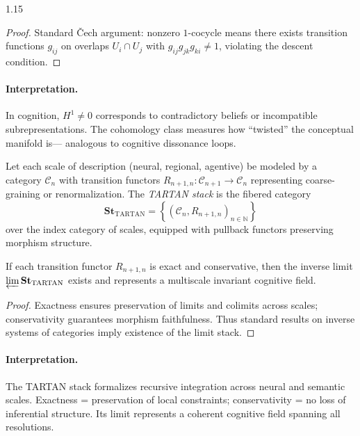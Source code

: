\documentclass[12pt,a4paper]{article}
\begin{document}
\begin{spacing}{1.15}
\begin{proof}
Standard Čech argument:
nonzero \(1\)-cocycle means there exists
transition functions \(g_{ij}\)
on overlaps \(U_i\cap U_j\)
with \(g_{ij}g_{jk}g_{ki}\neq 1\),
violating the descent condition.
\end{proof}

\paragraph{Interpretation.}
In cognition,
\(H^1\neq0\) corresponds to
contradictory beliefs or incompatible subrepresentations.
The cohomology class measures
how “twisted” the conceptual manifold is—
analogous to cognitive dissonance loops.

\begin{definition}
\label{def:stack}
Let each scale of description
(neural, regional, agentive)
be modeled by a category
\(\mathcal{C}_n\)
with transition functors
\(R_{n+1,n}:\mathcal{C}_{n+1}\to\mathcal{C}_n\)
representing coarse-graining or renormalization.
The \emph{TARTAN stack} is the fibered category
\[
  \mathbf{St}_{\mathrm{TARTAN}}
  = \left\{ (\mathcal{C}_n,R_{n+1,n})_{n\in\mathbb{N}} \right\}
\]
over the index category of scales,
equipped with pullback functors preserving morphism structure.
\end{definition}

\begin{proposition}
\label{prop:stack}
If each transition functor \(R_{n+1,n}\) is exact and conservative,
then the inverse limit
\(\varprojlim \mathbf{St}_{\mathrm{TARTAN}}\)
exists and represents
a multiscale invariant cognitive field.
\end{proposition}

\begin{proof}
Exactness ensures preservation of limits and colimits across scales;
conservativity guarantees morphism faithfulness.
Thus standard results on inverse systems of categories
imply existence of the limit stack.
\end{proof}

\paragraph{Interpretation.}
The TARTAN stack formalizes
recursive integration across neural and semantic scales.
Exactness = preservation of local constraints;
conservativity = no loss of inferential structure.
Its limit represents
a coherent cognitive field spanning all resolutions.


\end{spacing}
\end{document}
